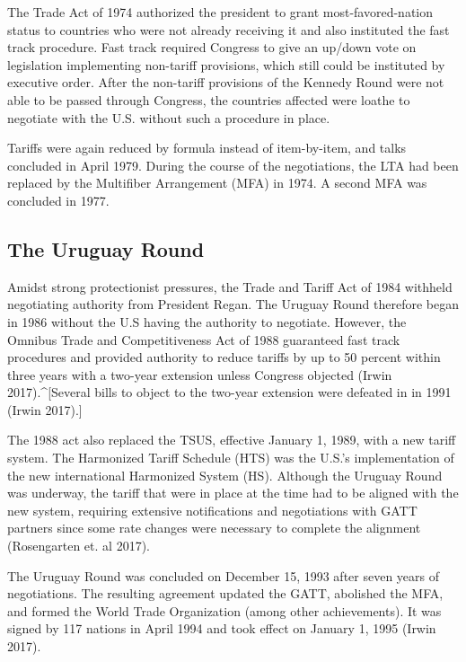 \documentclass[
  12pt,
]{article}
\begin{document}
The Trade Act of 1974 authorized the president to grant most-favored-nation status to countries who were not already receiving it and also instituted the fast track procedure. Fast track required Congress to give an up/down vote on legislation implementing non-tariff provisions, which still could be instituted by executive order. After the non-tariff provisions of the Kennedy Round were not able to be passed through Congress, the countries affected were loathe to negotiate with the U.S. without such a procedure in place.

Tariffs were again reduced by formula instead of item-by-item, and talks concluded in April 1979. During the course of the negotiations, the LTA had been replaced by the Multifiber Arrangement (MFA) in 1974. A second MFA was concluded in 1977.

\hypertarget{the-uruguay-round}{%
\subsection{The Uruguay Round}\label{the-uruguay-round}}

Amidst strong protectionist pressures, the Trade and Tariff Act of 1984 withheld negotiating authority from President Regan. The Uruguay Round therefore began in 1986 without the U.S having the authority to negotiate. However, the Omnibus Trade and Competitiveness Act of 1988 guaranteed fast track procedures and provided authority to reduce tariffs by up to 50 percent within three years with a two-year extension unless Congress objected (Irwin 2017).\^{}{[}Several bills to object to the two-year extension were defeated in in 1991 (Irwin 2017).{]}

The 1988 act also replaced the TSUS, effective January 1, 1989, with a new tariff system. The Harmonized Tariff Schedule (HTS) was the U.S.'s implementation of the new international Harmonized System (HS). Although the Uruguay Round was underway, the tariff that were in place at the time had to be aligned with the new system, requiring extensive notifications and negotiations with GATT partners since some rate changes were necessary to complete the alignment (Rosengarten et. al 2017).

The Uruguay Round was concluded on December 15, 1993 after seven years of negotiations. The resulting agreement updated the GATT, abolished the MFA, and formed the World Trade Organization (among other achievements). It was signed by 117 nations in April 1994 and took effect on January 1, 1995 (Irwin 2017).
\end{document}
